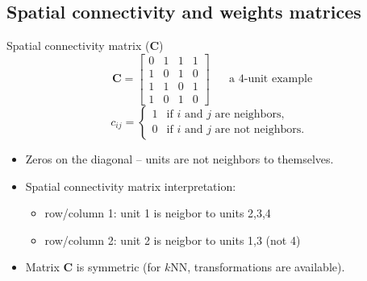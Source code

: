 \documentclass{beamer}
\begin{document}
\subsection{Spatial connectivity and weights matrices}
\begin{frame}{Spatial connectivity matrix ($\bm{C}$)}
$$
~~\bm{C} = \begin{bmatrix}
0 & 1 & 1 & 1 \\
1 & 0 & 1 & 0 \\
1 & 1 & 0 & 1 \\
1 & 0 & 1 & 0
\end{bmatrix}\quad \text{~~a 4-unit example}$$
$$c_{ij}=
	\begin{cases}
	1 & \text{if $i$ and $j$ are neighbors,}\\
	0 & \text{if $i$ and $j$ are not neighbors.}
	\end{cases}$$
\begin{itemize}
	\item Zeros on the diagonal -- units are not neighbors to themselves.
	\smallskip
	\item Spatial connectivity matrix interpretation: 
	\smallskip
	\begin{itemize}
		\item row/column 1: unit 1 is neigbor to units 2,3,4
		\item row/column 2: unit 2 is neigbor to units 1,3 (not 4)
	\end{itemize}
	\smallskip
    \item Matrix $\bm{C}$ is symmetric (for $k$NN, transformations are available).
\end{itemize}
\end{frame}
\end{document}
